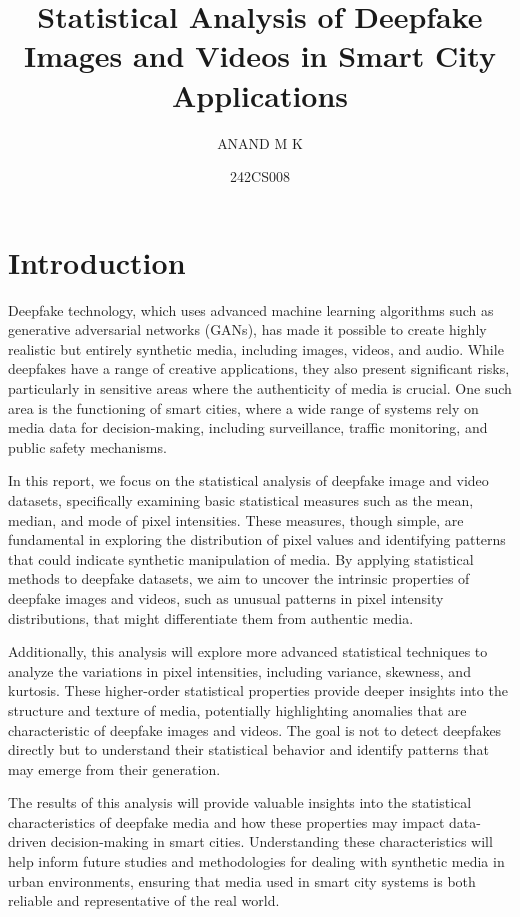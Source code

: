 \documentclass{article}
\title{Statistical Analysis of Deepfake Images and Videos in Smart City Applications}
\author{ANAND M K }
\date{242CS008}
\begin{document}
\maketitle

\section{Introduction}
Deepfake technology, which uses advanced machine learning algorithms such as generative adversarial networks (GANs), has made it possible to create highly realistic but entirely synthetic media, including images, videos, and audio. While deepfakes have a range of creative applications, they also present significant risks, particularly in sensitive areas where the authenticity of media is crucial. One such area is the functioning of smart cities, where a wide range of systems rely on media data for decision-making, including surveillance, traffic monitoring, and public safety mechanisms.

In this report, we focus on the statistical analysis of deepfake image and video datasets, specifically examining basic statistical measures such as the mean, median, and mode of pixel intensities. These measures, though simple, are fundamental in exploring the distribution of pixel values and identifying patterns that could indicate synthetic manipulation of media. By applying statistical methods to deepfake datasets, we aim to uncover the intrinsic properties of deepfake images and videos, such as unusual patterns in pixel intensity distributions, that might differentiate them from authentic media.

Additionally, this analysis will explore more advanced statistical techniques to analyze the variations in pixel intensities, including variance, skewness, and kurtosis. These higher-order statistical properties provide deeper insights into the structure and texture of media, potentially highlighting anomalies that are characteristic of deepfake images and videos. The goal is not to detect deepfakes directly but to understand their statistical behavior and identify patterns that may emerge from their generation.

The results of this analysis will provide valuable insights into the statistical characteristics of deepfake media and how these properties may impact data-driven decision-making in smart cities. Understanding these characteristics will help inform future studies and methodologies for dealing with synthetic media in urban environments, ensuring that media used in smart city systems is both reliable and representative of the real world.
\end{document}
